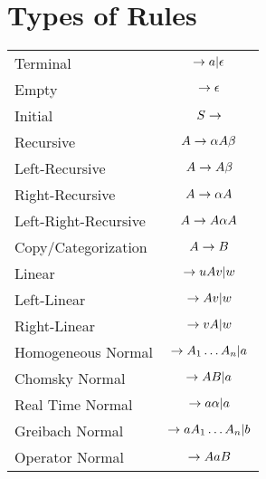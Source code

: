 \section{Types of Rules}

\begin{table}[H]
    \centering
    \begin{tabularx}{\textwidth}{| l | c |}
        Terminal & $\rightarrow a | \epsilon$ \\
        Empty & $\rightarrow \epsilon$ \\
        Initial & $S \rightarrow$ \\
        Recursive & $A \rightarrow \alpha A \beta$ \\
        Left-Recursive & $A \rightarrow A \beta$ \\
        Right-Recursive & $A \rightarrow \alpha A$ \\
        Left-Right-Recursive & $A \rightarrow A \alpha A$ \\
        Copy/Categorization & $A \rightarrow B$ \\
        Linear & $\rightarrow u A v | w$ \\
        Left-Linear & $\rightarrow A v | w$ \\
        Right-Linear & $\rightarrow v A | w$ \\
        Homogeneous Normal & $\rightarrow A_1\ldots A_n | a$ \\
        Chomsky Normal & $\rightarrow AB | a$ \\
        Real Time Normal & $\rightarrow a \alpha | a$ \\
        Greibach Normal & $\rightarrow a A_1\ldots A_n | b$ \\
        Operator Normal & $\rightarrow A a B$ \\
    \end{tabularx}
\end{table}
